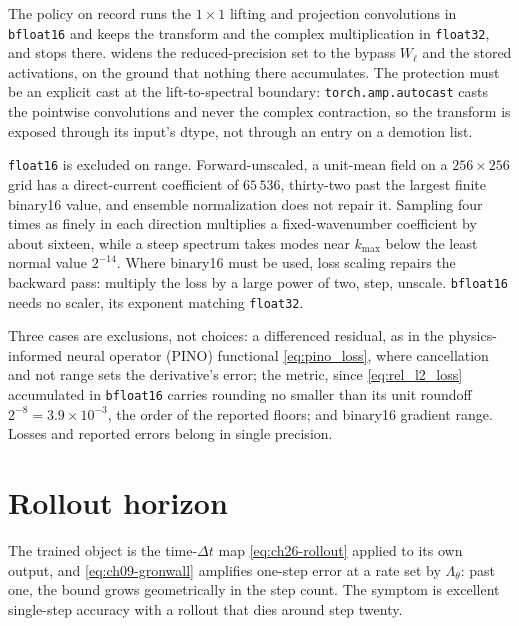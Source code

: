 The policy on record runs the $1\times1$ lifting and projection
convolutions in \texttt{bfloat16} and keeps the transform and the complex
multiplication in \texttt{float32}, and stops there.
 widens the
reduced-precision set to the bypass $W_\ell$ and the stored activations, on the
ground that nothing there accumulates. The protection must be an explicit cast
at the lift-to-spectral boundary: \texttt{torch.amp.autocast} casts the pointwise
convolutions and never the complex contraction, so the transform is exposed through
its input's dtype, not through an entry on a demotion list.

\texttt{float16} is excluded on range. Forward-unscaled, a unit-mean field on a
$256\times256$ grid has a direct-current coefficient of $65\,536$, thirty-two past
the largest finite binary16 value, and ensemble normalization does not repair it.
Sampling four times as finely in each direction multiplies a fixed-wavenumber
coefficient by about sixteen, while a steep spectrum takes modes near $k_{\max}$
below the least normal value $2^{-14}$. Where binary16 must be used, loss scaling
repairs the backward pass: multiply the loss by a large power of two, step, unscale.
\texttt{bfloat16} needs no scaler, its exponent matching \texttt{float32}.

Three cases are exclusions, not choices: a differenced residual, as in the
physics-informed neural operator (PINO) functional \eqref{eq:pino_loss}, where
cancellation and not range sets the derivative's error; the metric, since
\eqref{eq:rel_l2_loss} accumulated in \texttt{bfloat16} carries rounding no smaller
than its unit roundoff $2^{-8} = 3.9\times10^{-3}$, the order of the reported
floors; and binary16 gradient range. Losses and reported errors belong in single precision.

\section{Rollout horizon}
\label{sec:appd-rollout}

The trained object is the time-$\Delta t$ map \eqref{eq:ch26-rollout} applied to its
own output, and \eqref{eq:ch09-gronwall} amplifies one-step error at a rate set by
$\Lambda_\theta$: past one, the bound grows geometrically in the step count. The symptom is excellent single-step
accuracy with a rollout that dies around step twenty.

